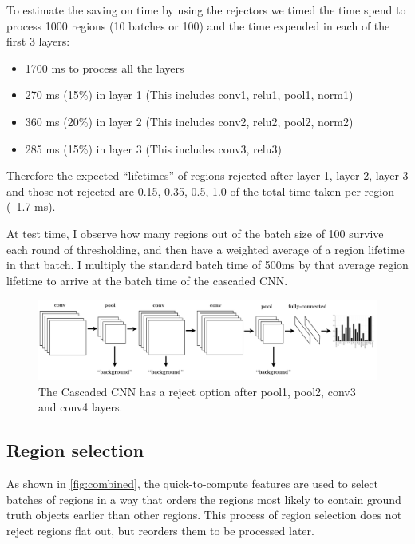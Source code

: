 To estimate the saving on time by using the rejectors we timed the time spend to process 1000 regions (10 batches or 100) and the time expended in each of the first 3 layers:
\begin{itemize}
\item 1700 ms to process all the layers
\item 270 ms (15\%) in layer 1 (This includes conv1, relu1, pool1, norm1)
\item 360 ms (20\%) in layer 2 (This includes conv2, relu2, pool2, norm2)
\item 285 ms (15\%) in layer 3 (This includes conv3, relu3)
\end{itemize}

Therefore the expected ``lifetimes'' of regions rejected after layer 1, layer 2, layer 3 and those not rejected are  0.15, 0.35, 0.5, 1.0 of the total time taken per region (~1.7 ms).

At test time, I observe how many regions out of the batch size of 100 survive each round of thresholding, and then have a weighted average of a region lifetime in that batch. I multiply the standard batch time of 500ms by that average region lifetime to arrive at the batch time of the cascaded CNN.

\begin{figure}[h!]
\begin{center}
\includegraphics[width=0.98\columnwidth]{figures/ccnn.pdf}
\caption{
The Cascaded CNN has a reject option after pool1, pool2, conv3 and conv4 layers.
}\label{fig:ccnn}
\end{center}
\end{figure}

\subsection{Region selection}\label{sec:dynamic}

As shown in \autoref{fig:combined}, the quick-to-compute features are used to select batches of regions in a way that orders the regions most likely to contain ground truth objects earlier than other regions.
This process of region selection does not reject regions flat out, but reorders them to be processed later.

